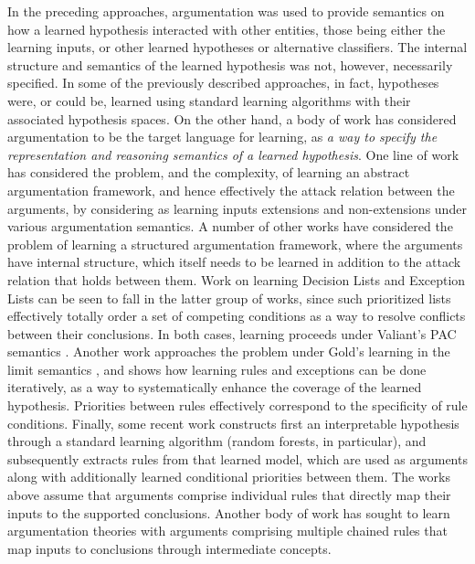 In the preceding approaches, argumentation was used to provide semantics on how a learned hypothesis interacted with other entities, those being either the learning inputs, or other learned hypotheses or alternative classifiers. The internal structure and semantics of the learned hypothesis was not, however, necessarily specified. In some of the previously described approaches, in fact, hypotheses were, or could be, learned using standard learning algorithms with their associated hypothesis spaces. On the other hand, a body of work has considered argumentation to be the target language for learning, as \emph{a way to specify the representation and reasoning semantics of a learned hypothesis}. 
One line of work  has considered the problem, and the complexity, of learning an abstract argumentation framework, and hence effectively the attack relation between the arguments, by considering as learning inputs extensions and non-extensions under various argumentation semantics. A number of other works have considered the problem of learning a structured argumentation framework, where the arguments have internal structure, which itself needs to be learned in addition to the attack relation that holds between them.
Work on learning Decision Lists  and Exception Lists  can be seen to fall in the latter group of works, since such prioritized lists effectively totally order a set of competing conditions as a way to resolve conflicts between their conclusions. In both cases, learning proceeds under Valiant's PAC semantics . Another work  approaches the problem under Gold's learning in the limit semantics , and shows how learning rules and exceptions can be done iteratively, as a way to systematically enhance the coverage of the learned hypothesis. Priorities between rules effectively correspond to the specificity of rule conditions. Finally, some recent work  constructs first an interpretable hypothesis through a standard learning algorithm (random forests, in particular), and subsequently extracts rules from that learned model, which are used as arguments along with additionally learned conditional priorities between them.
The works above assume that arguments comprise individual rules that directly map their inputs to the supported conclusions. Another body of work has sought to learn argumentation theories with arguments comprising multiple chained rules that map inputs to conclusions through intermediate concepts.
